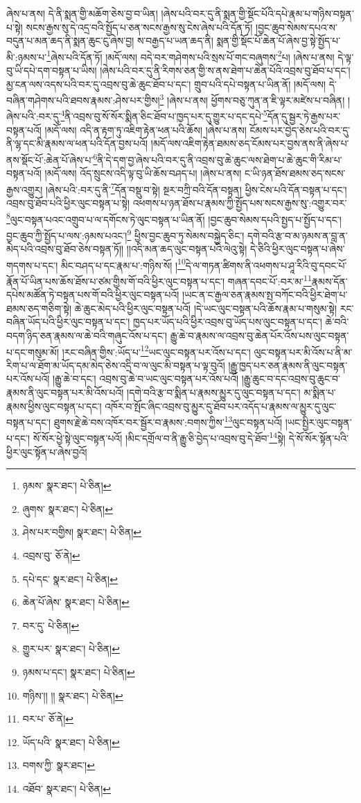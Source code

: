 ཞེས་པ་ནས། དེ་ནི་སྨན་གྱི་མཆོག་ཅེས་བྱ་བ་ཡིན། །ཞེས་པའི་བར་དུ་ནི་སྨན་གྱི་སྡོང་པོའི་དཔེ་རྣམ་པ་གཉིས་བསྟན་པ་སྟེ། སངས་རྒྱས་སུ་དེ་འདྲ་བའི་སྤྱོད་པ་ཅན་སངས་རྒྱས་སུ་ངེས་ཞེས་པའི་དོན་ཏོ། །བྱང་ཆུབ་སེམས་དཔའ་ས་བདུན་པ་མན་ཆད་ནི་སྨན་ཆུང་ངུ་ཞེས་བྱ། ས་བརྒྱད་པ་ཡན་ཆད་ནི། སྨན་གྱི་སྡོང་པོ་ཆེན་པོ་ཞེས་བྱ་སྟེ་སྤྱོད་པ་མི་:ཉམས་པ་\footnote{ཉམས་  སྣར་ཐང་།  པེ་ཅིན། }ཞེས་པའི་དོན་ཏོ། །མདོ་ལས། བདེ་བར་གཤེགས་པའི་སྲས་པོ་གང་བཞུགས་\footnote{ཞུགས་  སྣར་ཐང་།  པེ་ཅིན། }པ། །ཞེས་པ་ནས། དེ་ལྟ་བུ་ཡི་དཔེ་དག་བསྟན་པ་ཡིས། །ཞེས་པའི་བར་དུ་ནི་རིགས་ཅན་གྱི་ས་ནས་ཐེག་པ་ཆེན་པོའི་འབྲས་བུ་ཐོབ་པ་དང་། མྱ་ངན་ལས་འདས་པའི་བར་དུ་འབྲས་བུ་ཆེ་ཆུང་ཐོབ་པ་དང་། གྲུབ་པའི་དཔེ་བསྟན་པ་ཡིན་ནོ། །མདོ་ལས། དེ་བཞིན་གཤེགས་པའི་ཐབས་རྣམས་:ཤེས་པར་གྱིས།\footnote{ཤེས་པར་བགྱིས།  སྣར་ཐང་།  པེ་ཅིན། } །ཞེས་པ་ནས། ཕྱོགས་བཅུ་ཀུན་ན་ཇི་ལྟར་མཛེས་པ་བཞིན། །ཞེས་པའི་:བར་དུ་\footnote{འབྲས་བུ་  ཅོ་ནེ། }ནི་འབྲས་བུ་སོ་སོར་སྨིན་ཅིང་ཐོབ་པ་ཁྱད་པར་དུ་གྱུར་པ་དང་དཔེ་\footnote{དཔེ་དང་  སྣར་ཐང་།  པེ་ཅིན། }དོན་དུ་སྦྱར་ཏེ་རྒྱས་པར་བསྟན་པའོ། །མདོ་ལས། འདི་ན་རྟག་ཏུ་འཇིག་རྟེན་ཕན་པའི་ཆོས། །ཞེས་པ་ནས། ངོམས་པར་བྱེད་ཅེས་པའི་བར་དུ་ནི་ལྷ་དང་མི་རྣམས་ལ་ཕན་པའི་དོན་བྱས་པའོ། །མདོ་ལས་འཇིག་རྟེན་ཐམས་ཅད་ངོམས་པར་བྱས་ནས་ནི་ཞེས་པ་ནས་སྡོང་པོ་:ཆེན་པོ་ཞེས་པ་\footnote{ཆེན་པོ་ཞེས་  སྣར་ཐང་།  པེ་ཅིན། }ནི་དེ་དག་བྱ་ཞེས་པའི་བར་དུ་ནི་འབྲས་བུ་ཆེ་ཆུང་ལས་ཐེག་པ་ཆེ་ཆུང་གི་རིམ་པ་བསྟན་པའོ། །མདོ་ལས། འོད་སྲུངས་འདི་ལྟ་བུ་ཡི་ཆོས་བཤད་པ། །ཞེས་པ་ནས། ང་ཡི་ཉན་ཐོས་ཐམས་ཅད་སངས་རྒྱས་འགྱུར། །ཞེས་པའི་:བར་དུ་ནི་\footnote{བར་དུ་  པེ་ཅིན། }དོན་བསྡུ་བ་སྟེ། སྔར་བཀྲི་བའི་དོན་བསྟན། ཕྱིས་ངེས་པའི་དོན་བསྟན་པ་དང་། འབྲས་བུ་ཐོབ་པའི་ཕྱིར་ལུང་བསྟན་པ་སྟེ། འཕགས་པ་ཉན་ཐོས་པ་རྣམས་ཀྱི་སྤྱོད་པས་སངས་རྒྱས་སུ་:འགྱུར་བར་\footnote{གྱུར་པར་  སྣར་ཐང་།  པེ་ཅིན། }ལུང་བསྟན་པའང་འགྲུབ་པ་ལ་དགོངས་ཏེ་ལུང་བསྟན་པ་ཡིན་ནོ། །བྱང་ཆུབ་སེམས་དཔའི་སྤྱད་པ་སྤྱོད་པ་དང་། བྱང་ཆུབ་ཀྱི་སྤྱོད་པ་ལས་:ཉམས་པའང་།\footnote{ཉམས་པ་དང་།  སྣར་ཐང་།  པེ་ཅིན། } ཕྱིས་བྱང་ཆུབ་ཏུ་སེམས་བསྐྱེད་ཅིང་། དགེ་བའི་རྩ་བ་མ་ཉམས་ན་བླ་ན་མེད་པའི་འབྲས་བུ་ཐོབ་ཅེས་བསྟན་ཏོ།། །།འདི་མན་ཆད་ལུང་བསྟན་པའི་ལེའུ་སྟེ། དེ་ཅིའི་ཕྱིར་ལུང་བསྟན་པ་ཞེས་གདགས་པ་དང་། མིང་བཤད་པ་དང་རྣམ་པ་:གཉིས་སོ། །\footnote{གཉིས་།། །།  སྣར་ཐང་།  པེ་ཅིན། }དེ་ལ་གཏན་ཚིགས་ནི་འཕགས་པ་ཤཱ་རིའི་བུ་དབང་པོ་རྣོན་པོ་ཡིན་པས་ཆོས་ཐོས་པ་ཙམ་གྱིས་གོ་བའི་ཕྱིར་ལུང་བསྟན་པ་དང་། གཞན་དབང་པོ་:བར་མ་\footnote{བར་པ་  ཅོ་ནེ། }རྣམས་དོན་དཔེས་མཚོན་ཏེ་བསྟན་པས་གོ་བའི་ཕྱིར་ལུང་བསྟན་པའོ། །ཡང་ན་ང་རྒྱལ་ཅན་རྣམས་སྤ་བཀོང་བའི་ཕྱིར་ཐེག་པ་ཐམས་ཅད་གཅིག་སྟེ། ཆེ་ཆུང་མེད་པའི་ཕྱིར་ལུང་བསྟན་པའོ། །དེ་ཡང་ལུང་བསྟན་པའི་ཆོས་རྣམ་པ་གསུམ་སྟེ། རང་བཞིན་ཡོད་པའི་ཕྱིར་ལུང་བསྟན་པ་དང་། ཁྱད་པར་ཡོད་པའི་ཕྱིར་འབྲས་བུ་ཡོད་པས་ལུང་བསྟན་པ་དང་། ཆེ་བའི་བདག་ཉིད་ཅན་རྣམས་ལ་ཆེ་བའི་གཞུང་འོས་པ་དང་། རྒྱུ་ཆེ་བ་རྣམས་ལ་འབྲས་བུ་ཆེན་པོར་འོས་པས་ལུང་བསྟན་པ་དང་གསུམ་མོ། །རང་བཞིན་གྱིས་:ཡོད་པ་\footnote{ཡོད་པའི་  སྣར་ཐང་།  པེ་ཅིན། }ཡང་ལུང་བསྟན་པར་འོས་པ་དང་། ལུང་བསྟན་པར་མི་འོས་པ་ནི་མ་རིག་པ་ལ་ཐོག་མ་ཡོད་དམ་མེད་ཅེས་འདྲི་བ་ལ་ལུང་མི་བསྟན་པ་ལྟ་བུའོ། །རྒྱུ་ཁྱད་པར་ཅན་རྣམས་ནི་ལུང་བསྟན་པར་འོས་པའོ། །རྒྱུ་ཆེ་བ་དང་། འབྲས་བུ་ཆེ་བ་ཡང་ལུང་བསྟན་པར་འོས་པའོ། །རྒྱུ་ཆུང་བ་དང་འབྲས་བུ་ཆུང་བ་རྣམས་ནི་ལུང་བསྟན་པར་མི་འོས་པའོ། །དགེ་བའི་རྩ་བ་སྨིན་པ་རྣམས་མྱུར་དུ་ལུང་བསྟན་པ་དང་། མ་སྨིན་པ་རྣམས་ཕྱིས་ལུང་བསྟན་པ་དང་། འཁོར་བ་སྤོང་ཞིང་འབྲས་བུ་མྱུར་དུ་ཐོབ་པར་འདོད་པ་རྣམས་ལ་མྱུར་དུ་ལུང་བསྟན་པ་དང་། ཐུགས་རྗེ་ཆེ་བས་འཁོར་བར་སྦྱོར་བ་རྣམས་:བགས་ཀྱིས་\footnote{བགས་ཀྱི་  སྣར་ཐང་། }ལུང་བསྟན་པའོ། །ཡང་སྤྱིར་ལུང་བསྟན་པ་དང་། སོ་སོར་ཕྱེ་སྟེ་ལུང་བསྟན་པའོ། །མིང་དགྲོལ་བ་ནི་རྒྱུ་ཅི་བྱེད་པ་འབྲས་བུ་དེ་ཐོབ་\footnote{འཐོབ་  སྣར་ཐང་།  པེ་ཅིན། }སྟེ། དེ་སོ་སོར་སྟོན་པའི་ཕྱིར་ལུང་སྟོན་པ་ཞེས་བྱའོ། 